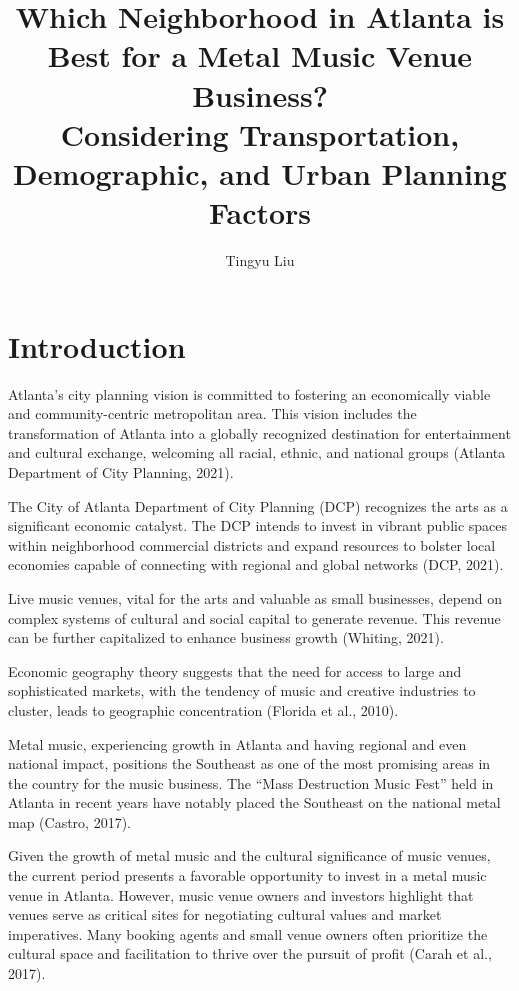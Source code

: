 \documentclass[11pt]{article}
\title{Which Neighborhood in Atlanta is Best for a Metal Music Venue Business? \\
Considering Transportation, Demographic, and Urban Planning Factors\\
}
\author{Tingyu Liu}
\begin{document}
    
\tableofcontents

\newpage

\section{Introduction}

Atlanta’s city planning vision is committed to fostering an economically viable and community-centric metropolitan area. This vision includes the transformation of Atlanta into a globally recognized destination for entertainment and cultural exchange, welcoming all racial, ethnic, and national groups (Atlanta Department of City Planning, 2021).

The City of Atlanta Department of City Planning (DCP) recognizes the arts as a significant economic catalyst. The DCP intends to invest in vibrant public spaces within neighborhood commercial districts and expand resources to bolster local economies capable of connecting with regional and global networks (DCP, 2021).

Live music venues, vital for the arts and valuable as small businesses, depend on complex systems of cultural and social capital to generate revenue. This revenue can be further capitalized to enhance business growth (Whiting, 2021).

Economic geography theory suggests that the need for access to large and sophisticated markets, with the tendency of music and creative industries to cluster, leads to geographic concentration (Florida et al., 2010).

Metal music, experiencing growth in Atlanta and having regional and even national impact, positions the Southeast as one of the most promising areas in the country for the music business. The “Mass Destruction Music Fest” held in Atlanta in recent years have notably placed the Southeast on the national metal map (Castro, 2017).

Given the growth of metal music and the cultural significance of music venues, the current period presents a favorable opportunity to invest in a metal music venue in Atlanta. However, music venue owners and investors highlight that venues serve as critical sites for negotiating cultural values and market imperatives. Many booking agents and small venue owners often prioritize the cultural space and facilitation to thrive over the pursuit of profit (Carah et al., 2017).
\end{document}
